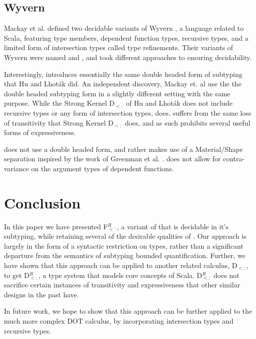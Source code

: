 \documentclass[runningheads, anon]{llncs}
\begin{document}
\subsection{Wyvern}

Mackay et al. \cite{10.1145/3371134} defined two decidable variants of Wyvern \cite{Nistor:2013:WST:2489828.2489830, Omar:2014:SCT:2945642.2945649}, a language related to Scala, featuring 
type members, dependent function types, recursive types, and a limited form of intersection types called type refinements.
Their variants of Wyvern were named \WFix and \WSelf, and took different approaches to ensuring decidability.

Interestingly, \WFix introduces essentially the same double headed form of subtyping that Hu and Lhot\'{a}k \cite{10.1145/3371077} did. 
An independent discovery, Mackay et. al  \cite{10.1145/3371134} use the the double headed subtyping form in a slightly different setting 
with the same purpose. While the Strong Kernel D$_{<:}$ of Hu and Lhot\'{a}k \cite{10.1145/3371077} does not include recursive types
or any form of intersection types, \WFix does. \WFix suffers from the same loss of transitivity that Strong Kernel D$_{<:}$ does, 
and as such prohibits several useful forms of expressiveness.

\WSelf does not use a double headed form, and rather makes use of a Material/Shape separation inspired by the work of
Greenman et al. \cite{Greenman:2014:GFP:2594291.2594308}. \WSelf does not allow for contra-variance on the argument types of 
dependent functions.


\section{Conclusion}

In this paper we have presented F$_{<:}^R$, a variant of \Fsub that is decidable in it's subtyping, while retaining several of the desirable qualities of 
\Fsub. Our approach is largely in the form of a syntactic restriction on types, rather than  a significant departure from the semantics of
subtyping bounded quantification. Further, we have shown that this approach can be applied to another related calculus, D$_{<:}$,  to get D$_{<:}^R$, 
a type system that models core concepts of Scala. D$_{<:}^R$ does not sacrifice certain instances of transitivity and expressiveness that other 
similar designs in the past have.

In future work, we hope to show that this approach can be further applied to the much more complex DOT calculus, by incorporating intersection types and
recursive types.
\end{document}
